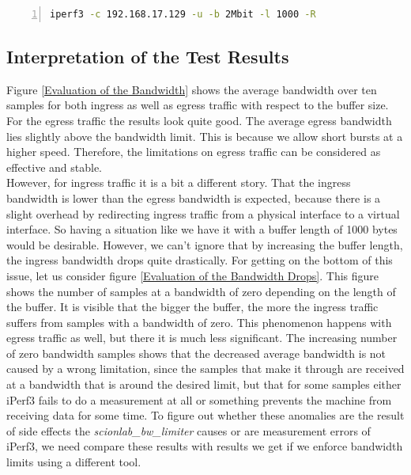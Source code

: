 \begin{lstlisting}[language=sh, caption = Example Ingress Test Command, captionpos=b, numbers=left, frame=single, breaklines=true, breakatwhitespace=true, showstringspaces=false, label=Example Ingress Test Command]
iperf3 -c 192.168.17.129 -u -b 2Mbit -l 1000 -R
\end{lstlisting}

\subsection{Interpretation of the Test Results}

Figure \ref{Evaluation of the Bandwidth} shows the average bandwidth over ten samples for both ingress as well as egress traffic with respect to the buffer size. For the egress traffic the results look quite good. The average egress bandwidth lies slightly above the bandwidth limit. This is because we allow short bursts at a higher speed. Therefore, the limitations on egress traffic can be considered as effective and stable.
\\
However, for ingress traffic it is a bit a different story. That the ingress bandwidth is lower than the egress bandwidth is expected, because there is a slight overhead by redirecting ingress traffic from a physical interface to a virtual interface. So having a situation like we have it with a buffer length of 1000 bytes would be desirable. However, we can't ignore that by increasing the buffer length, the ingress bandwidth drops quite drastically. For getting on the bottom of this issue, let us consider figure \ref{Evaluation of the Bandwidth Drops}. This figure shows the number of samples at a bandwidth of zero depending on the length of the buffer. It is visible that the bigger the buffer, the more the ingress traffic suffers from samples with a bandwidth of zero. This phenomenon happens with egress traffic as well, but there it is much less significant. The increasing number of zero bandwidth samples shows that the decreased average bandwidth is not caused by a wrong limitation, since the samples that make it through are received at a bandwidth that is around the desired limit, but that for some samples either iPerf3 fails to do a measurement at all or something prevents the machine from receiving data for some time. To figure out whether these anomalies are the result of side effects the \textit{scionlab\_bw\_limiter} causes or are measurement errors of iPerf3, we need compare these results with results we get if we enforce bandwidth limits using a different tool.

